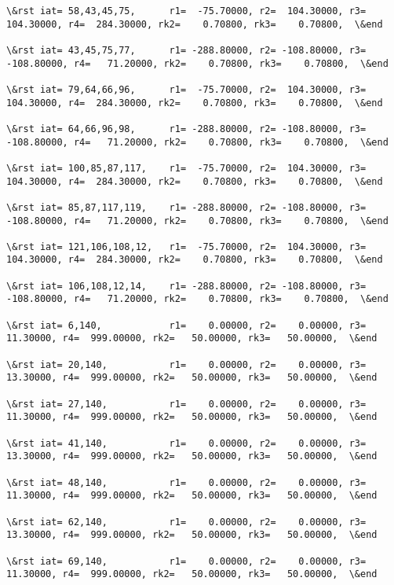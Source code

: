 \documentclass[11pt]{article}
\begin{document}
\begin{Verbatim}[commandchars=\\\{\}]
\&rst iat= 58,43,45,75,      r1=  -75.70000, r2=  104.30000, r3=  104.30000, r4=  284.30000, rk2=    0.70800, rk3=    0.70800,  \&end

\&rst iat= 43,45,75,77,      r1= -288.80000, r2= -108.80000, r3= -108.80000, r4=   71.20000, rk2=    0.70800, rk3=    0.70800,  \&end

\&rst iat= 79,64,66,96,      r1=  -75.70000, r2=  104.30000, r3=  104.30000, r4=  284.30000, rk2=    0.70800, rk3=    0.70800,  \&end

\&rst iat= 64,66,96,98,      r1= -288.80000, r2= -108.80000, r3= -108.80000, r4=   71.20000, rk2=    0.70800, rk3=    0.70800,  \&end

\&rst iat= 100,85,87,117,    r1=  -75.70000, r2=  104.30000, r3=  104.30000, r4=  284.30000, rk2=    0.70800, rk3=    0.70800,  \&end

\&rst iat= 85,87,117,119,    r1= -288.80000, r2= -108.80000, r3= -108.80000, r4=   71.20000, rk2=    0.70800, rk3=    0.70800,  \&end

\&rst iat= 121,106,108,12,   r1=  -75.70000, r2=  104.30000, r3=  104.30000, r4=  284.30000, rk2=    0.70800, rk3=    0.70800,  \&end

\&rst iat= 106,108,12,14,    r1= -288.80000, r2= -108.80000, r3= -108.80000, r4=   71.20000, rk2=    0.70800, rk3=    0.70800,  \&end

\&rst iat= 6,140,            r1=    0.00000, r2=    0.00000, r3=   11.30000, r4=  999.00000, rk2=   50.00000, rk3=   50.00000,  \&end

\&rst iat= 20,140,           r1=    0.00000, r2=    0.00000, r3=   13.30000, r4=  999.00000, rk2=   50.00000, rk3=   50.00000,  \&end

\&rst iat= 27,140,           r1=    0.00000, r2=    0.00000, r3=   11.30000, r4=  999.00000, rk2=   50.00000, rk3=   50.00000,  \&end

\&rst iat= 41,140,           r1=    0.00000, r2=    0.00000, r3=   13.30000, r4=  999.00000, rk2=   50.00000, rk3=   50.00000,  \&end

\&rst iat= 48,140,           r1=    0.00000, r2=    0.00000, r3=   11.30000, r4=  999.00000, rk2=   50.00000, rk3=   50.00000,  \&end

\&rst iat= 62,140,           r1=    0.00000, r2=    0.00000, r3=   13.30000, r4=  999.00000, rk2=   50.00000, rk3=   50.00000,  \&end

\&rst iat= 69,140,           r1=    0.00000, r2=    0.00000, r3=   11.30000, r4=  999.00000, rk2=   50.00000, rk3=   50.00000,  \&end


\end{Verbatim}
\end{document}
